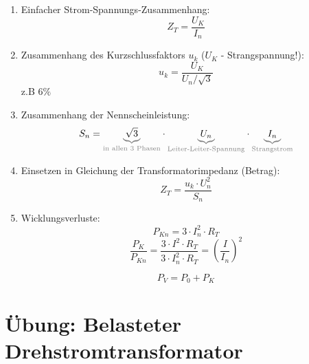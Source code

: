 \documentclass[a4paper]{article}
\begin{document}
\begin{enumerate}
    \item Einfacher Strom-Spannungs-Zusammenhang:
    \[Z_{T} = \frac{U_{K}}{I_{n}}\]
    \item Zusammenhang des Kurzschlussfaktors $u_{k}$ ($U_{K}$ - Strangspannung!):
    \[u_{k} = \frac{U_{K}}{U_{n} / \sqrt{3}}\] z.B $6 \si{\percent}$
    \item Zusammenhang der Nennscheinleistung:
    \[S_{n} = {\color{gray}\underbrace{\color{black}\sqrt{3}}_{\text{in allen 3 Phasen}}} \cdot {\color{gray}{\underbrace{\color{black}U_{n}}_{\text{Leiter-Leiter-Spannung}}}} \cdot {\color{gray}\underbrace{\color{black}I_{n}}_{\text{Strangstrom}}}\]

  \item Einsetzen in Gleichung der Transformatorimpedanz (Betrag):
    \[Z_{T} = \frac{u_{k} \cdot U_{n}^{2}}{S_{n}}\]

  \item Wicklungsverluste:
    \[P_{Kn} = 3 \cdot I_{n}^{2} \cdot R_{T}\]
    \[\frac{P_{K}}{P_{Kn}} = \frac{3 \cdot I^{2} \cdot R_{T}}{3 \cdot I_{n}^{2}\cdot R_{T}} = (\frac{I}{I_{n}})^{2}\]

    \[P_{V} = P_{0} + P_{K}\]

\end{enumerate}

\section{Übung: Belasteter Drehstromtransformator}
\end{document}
